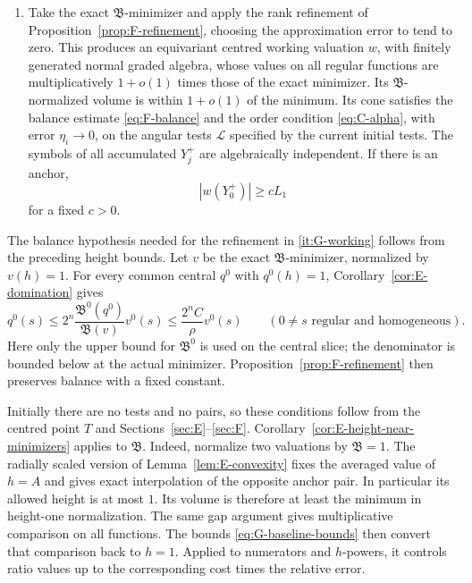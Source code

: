 \begin{enumerate}[label=\textup{(I\arabic*)}]
\item\label{it:G-working}
Take the exact $\mathfrak B$-minimizer and apply the rank refinement of
Proposition~\ref{prop:F-refinement}, choosing the approximation error to
tend to zero.  This produces an equivariant centred working valuation
$w$, with finitely generated normal graded algebra, whose values on all
regular functions are multiplicatively $1+o(1)$ times those of the exact
minimizer.  Its $\mathfrak B$-normalized volume is within $1+o(1)$ of the
minimum.  Its cone satisfies the balance estimate
\eqref{eq:F-balance} and the order condition \eqref{eq:C-alpha}, with error $\eta_i\to0$, on the angular tests
$\mathcal L$ specified by the current initial tests.  The symbols of all
accumulated $Y_j^+$ are algebraically independent.  If there is an anchor,
\begin{equation}\label{eq:G-anchor-size}
                        |w(Y_0^+)|\ge cL_1
\end{equation}
for a fixed $c>0$.
\end{enumerate}

The balance hypothesis needed for the refinement in
\ref{it:G-working} follows from the preceding height bounds.
Let $v$ be the exact $\mathfrak B$-minimizer, normalized by $v(h)=1$.
For every common central $q^0$ with $q^0(h)=1$,
Corollary~\ref{cor:E-domination} gives
\[
 q^0(s)\le 2^n\frac{\mathfrak B^0(q^0)}{\mathfrak B(v)}v^0(s)
          \le\frac{2^nC}{\rho}v^0(s)
 \qquad(0\ne s\text{ regular and homogeneous}).
\]
Here only the upper bound for $\mathfrak B^0$ is used on the central
slice; the denominator is bounded below at the actual minimizer.
Proposition~\ref{prop:F-refinement} then preserves balance with a fixed
constant.

Initially there are no tests and no pairs, so these conditions follow
from the centred point $T$ and Sections~\ref{sec:E}--\ref{sec:F}.
Corollary~\ref{cor:E-height-near-minimizers} applies to
$\mathfrak B$.  Indeed, normalize two valuations by $\mathfrak B=1$.
The radially scaled version of Lemma~\ref{lem:E-convexity} fixes
the averaged value of $h=A$ and gives exact interpolation of the opposite
anchor pair.  In particular its allowed height is at most $1$.
Its volume is therefore at least the minimum in height-one normalization.
The same gap argument gives multiplicative comparison on all functions.
The bounds \eqref{eq:G-baseline-bounds} then convert that comparison back
to $h=1$.  Applied to numerators and $h$-powers, it controls ratio values
up to the corresponding cost times the relative error.

